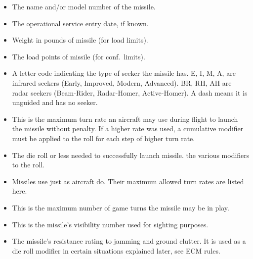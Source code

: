 \begin{itemize}

    \item {} The name and/or model number of the missile.

    \item {} The operational service entry date, if known.

    \item {} Weight in pounds of missile (for load limits).

    \item {} The load points of missile (for conf.\ limits).

    \item {} A letter code indicating the type of seeker the missile has. E, I, M, A, are infrared seekers (Early, Improved, Modern, Advanced).  BR, RH, AH are radar seekers (Beam-Rider, Radar-Homer, Active-Homer). A dash means it is unguided and has no seeker.

    \item {} This is the maximum turn rate an aircraft may use during flight to launch the missile without penalty. If a higher rate was used, a cumulative  modifier must be applied to the roll for each step of higher turn rate.

    \item {} The die roll or less needed to successfully launch missile.  the various modifiers to the roll.

    \item {} Missiles use  just as aircraft do. Their maximum allowed turn rates are listed here.

    \item {} This is the maximum number of game turns the missile may be in play.

    \item {} This is the missile's visibility number used for sighting purposes.

    \item {} The missile's resistance rating to jamming and ground clutter. It is used as a die roll modifier in certain situations explained later, see ECM rules.


\end{itemize}
